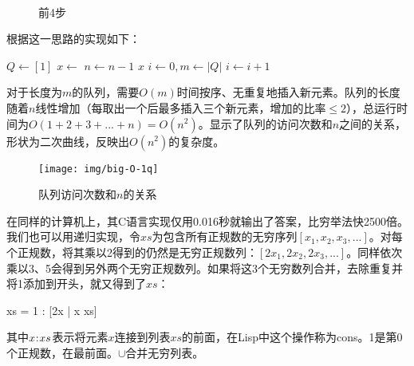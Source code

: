 \documentclass[b5paper]{ctexart}
\begin{document}
\begin{figure}[htbp]
  \centering
  \hspace{.1\textwidth}
  \\
  \hspace{.1\textwidth}
  \caption{前4步}
  \label{fig:queues}
\end{figure}

根据这一思路的实现如下：

\begin{algorithmic}[1]
  \State $Q \gets [1]$
    \State $x \gets$ 
    \State {}
    \State {}
    \State {}
    \State $n \gets n-1$
  \EndWhile
  \State \Return $x$
\EndFunction
\Statex
{}
  \State $i \gets 0, m \gets |Q|$
    \State $i \gets i + 1$
  \EndWhile
    \State {}
  \EndIf
\EndFunction
\end{algorithmic}

对于长度为$m$的队列，需要$O(m)$时间按序、无重复地插入新元素。队列的长度随着$n$线性增加（每取出一个后最多插入三个新元素，增加的比率$\leq 2$），总运行时间为$O(1 + 2 + 3 + ... + n) = O(n^2)$。显示了队列的访问次数和$n$之间的关系，形状为二次曲线，反映出$O(n^2)$的复杂度。

\begin{figure}[htbp]
  \centering
  \texttt{[image: img/big-O-1q]}
  \caption{队列访问次数和$n$的关系}
  \label{fig:big-O-1q}
\end{figure}

在同样的计算机上，其C语言实现仅用0.016秒就输出了答案，比穷举法快2500倍。我们也可以用递归实现，令$xs$为包含所有正规数的无穷序列$[x_1, x_2, x_3, ...]$。对每个正规数，将其乘以2得到的仍然是无穷正规数列：$[2x_1, 2x_2, 2x_3, ...]$。同样依次乘以3、5会得到另外两个无穷正规数列。如果将这3个无穷数列合并，去除重复并将1添加到开头，就又得到了$xs$：

\be
  xs = 1 : [2x | x \gets xs] \cup [3x | x \gets xs] \cup [5x | x \gets xs]
\ee

其中$x \mathbin{\!:\!} xs$表示将元素$x$连接到列表$xs$的前面，在Lisp中这个操作称为cons。1是第0个正规数，在最前面。$\cup$合并无穷列表。
\end{document}
